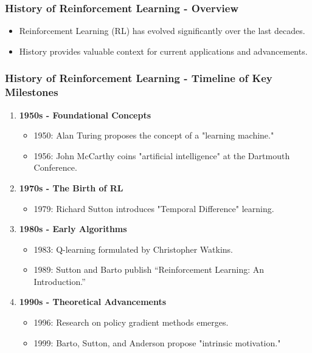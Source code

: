 \documentclass[aspectratio=169]{beamer}
\begin{document}
\begin{frame}[fragile]
    \frametitle{History of Reinforcement Learning - Overview}
    \begin{itemize}
        \item Reinforcement Learning (RL) has evolved significantly over the last decades.
        \item History provides valuable context for current applications and advancements.
    \end{itemize}
\end{frame}

\begin{frame}[fragile]
    \frametitle{History of Reinforcement Learning - Timeline of Key Milestones}
    \begin{enumerate}
        \item \textbf{1950s - Foundational Concepts}
        \begin{itemize}
            \item 1950: Alan Turing proposes the concept of a "learning machine."
            \item 1956: John McCarthy coins "artificial intelligence" at the Dartmouth Conference.
        \end{itemize}
        
        \item \textbf{1970s - The Birth of RL}
        \begin{itemize}
            \item 1979: Richard Sutton introduces "Temporal Difference" learning.
        \end{itemize}

        \item \textbf{1980s - Early Algorithms}
        \begin{itemize}
            \item 1983: Q-learning formulated by Christopher Watkins.
            \item 1989: Sutton and Barto publish “Reinforcement Learning: An Introduction.”
        \end{itemize}

        \item \textbf{1990s - Theoretical Advancements}
        \begin{itemize}
            \item 1996: Research on policy gradient methods emerges.
            \item 1999: Barto, Sutton, and Anderson propose "intrinsic motivation."
        \end{itemize}
    \end{enumerate}
\end{frame}
\end{document}
